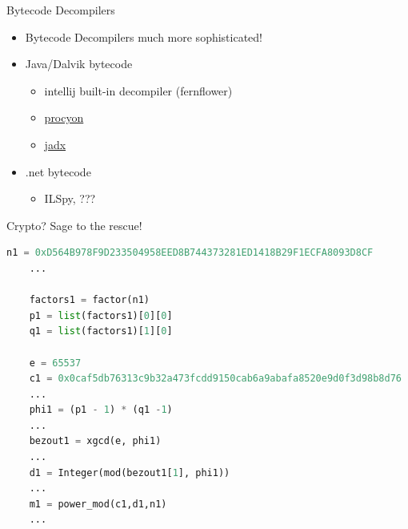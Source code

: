 \begin{frame}[fragile]
  {Bytecode Decompilers}

  \begin{itemize}
    \item Bytecode Decompilers much more sophisticated!
    \item Java/Dalvik bytecode
      \begin{itemize}
        \item intellij built-in decompiler (fernflower)
        \item
          \href{https://bitbucket.org/mstrobel/procyon/}{procyon}
        \item \href{https://github.com/skylot/jadx}{jadx}
      \end{itemize}
    \item .net bytecode
      \begin{itemize}
        \item ILSpy, ???
      \end{itemize}
  \end{itemize}

\end{frame}



\begin{frame}[fragile]
	{Crypto? Sage to the rescue!}

  \begin{lstlisting}[language=python]
	n1 = 0xD564B978F9D233504958EED8B744373281ED1418B29F1ECFA8093D8CF
	...

	factors1 = factor(n1)
	p1 = list(factors1)[0][0]
	q1 = list(factors1)[1][0]

	e = 65537
	c1 = 0x0caf5db76313c9b32a473fcdd9150cab6a9abafa8520e9d0f3d98b8d76
	...
	phi1 = (p1 - 1) * (q1 -1)
	...
	bezout1 = xgcd(e, phi1)
	...
	d1 = Integer(mod(bezout1[1], phi1))
	...
	m1 = power_mod(c1,d1,n1)
	...
  \end{lstlisting}
\end{frame}


\begin{frame}

\end{frame}


